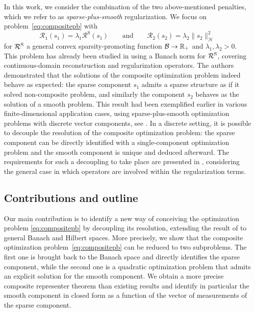 \documentclass[12pt]{article}
\begin{document}
    In this work, we consider the combination of the two above-mentioned penalties, which we refer to as \emph{sparse-plus-smooth} regularization. We focus on problem~\eqref{eq:compositepb} with
        \begin{equation*}
        \mathcal{R}_1 (s_1) = \lambda_1 \mathcal{R}^\mathrm{S}(s_1) \qquad\text{and}\qquad \mathcal{R}_2 (s_2) = \lambda_2 \| s_2 \|_{\mathcal{H}}^2
    \end{equation*}
    for $\mathcal{R}^\mathrm{S}$ a general convex sparsity-promoting function $\mathcal{B} \to \mathbb{R}_+$ and $\lambda_1, \lambda_2 > 0$. This problem has already been studied in \cite{debarre2021continuous} using a Banach norm for $\mathcal{R}^\mathrm{S}$, covering continuous-domain reconstruction and regularization operators. The authors demonstrated that the solutions of the composite optimization problem indeed behave as expected: the sparse component $s_1$ admits a sparse structure as if it solved non-composite problem, and similarly the component $s_2$ behaves as the solution of a smooth problem. This result had been exemplified earlier in various finite-dimensional application cases, using sparse-plus-smooth optimization problems with discrete vector components, see \cite{mol2004,gholami2013balanced,debarnot2020learning}. In a discrete setting, it is possible to decouple the resolution of the composite optimization problem: the sparse component can be directly identified with a single-component optimization problem and the smooth component is unique and deduced afterward. The requirements for such a decoupling to take place are presented in \cite{jarret2024decoupled}, considering the general case in which operators are involved within the regularization terms.


    \subsection{Contributions and outline}

    Our main contribution is to identify a new way of conceiving the optimization problem \eqref{eq:compositepb} by decoupling its resolution, extending the result of \cite{jarret2024decoupled} to general Banach and Hilbert spaces. More precisely, we show that the composite optimization problem~\eqref{eq:compositepb} can be reduced to two subproblems. The first one is brought back to the Banach space and directly identifies the sparse component, while the second one is a quadratic optimization problem that admits an explicit solution for the smooth component. We obtain a more precise composite representer theorem than existing results and identify in particular the smooth component in closed form as a function of the vector of measurements of the sparse component.
\end{document}
